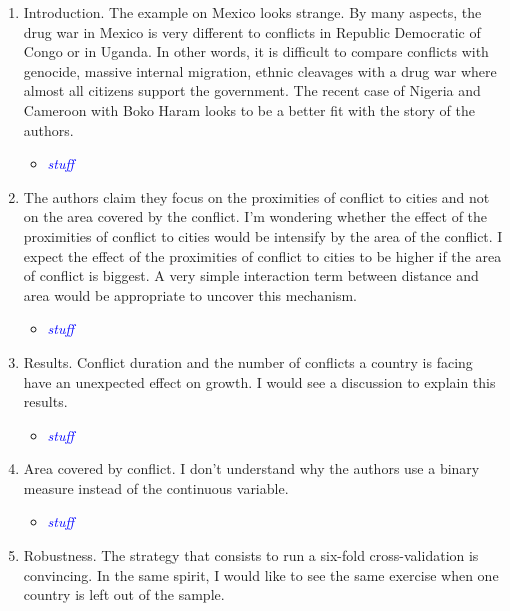 \documentclass[12pt,onesided,fullpage]{amsart}
\begin{document}
\begin{enumerate}

\item Introduction. The example on Mexico looks strange. By many aspects, the drug war in Mexico is very different to conflicts in Republic Democratic of Congo or in Uganda. In other words, it is difficult to compare conflicts with genocide, massive internal migration, ethnic cleavages with a drug war where almost all citizens support the government. The recent case of Nigeria and Cameroon with Boko Haram looks to be a better fit with the story of the authors.

\begin{itemize}
\item \textcolor{blue}{\emph{stuff}}
\end{itemize}

\item The authors claim they focus on the proximities of conflict to cities and not on the area covered by the conflict. I’m wondering whether the effect of the proximities of conflict to cities would be intensify by the area of the conflict. I expect the effect of the proximities of conflict to cities to be higher if the area of conflict is biggest. A very simple interaction term between distance and area would be appropriate to uncover this mechanism.

\begin{itemize}
\item \textcolor{blue}{\emph{stuff}}
\end{itemize}

\item Results. Conflict duration and the number of conflicts a country is facing have an unexpected effect on growth. I would see a discussion to explain this results.

\begin{itemize}
\item \textcolor{blue}{\emph{stuff}}
\end{itemize}

\item Area covered by conflict. I don’t understand why the authors use a binary measure instead of the continuous variable.

\begin{itemize}
\item \textcolor{blue}{\emph{stuff}}
\end{itemize}

\item Robustness. The strategy that consists to run a six-fold cross-validation is convincing. In the same spirit, I would like to see the same exercise when one country is left out of the sample.


\end{enumerate}
\end{document}
